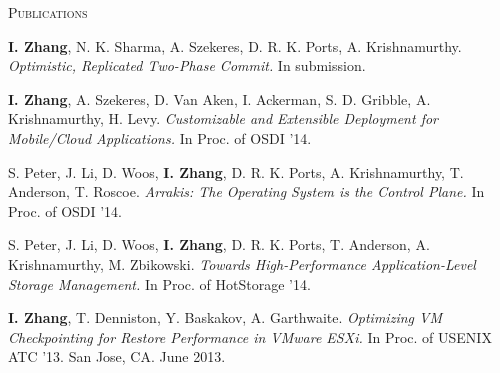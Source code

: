 \documentclass[10pt,times]{report}
\newlength{\sectiongap}
\newlength{\entrygap}
\newlength{\sectioncolwidth}
\newlength{\colgap}
\newlength{\stuffwidth}
\def\ifEqString#1#2{\def\testa{#1}\def\testb{#2}%
  \ifx\testa\testb}
\newenvironment{rtable}{
  \begin{minipage}{\textwidth}
  }{
  \end{minipage}
}
\newenvironment{rentry}[3][xxx]{
  \begin{minipage}[t]{\hsize}
    \textbf{#2}\ifEqString{#1}{xxx}\relax\else, \textit{#1}\fi
    \hspace{\stretch{1}} #3 \\
  }{
    \removelastskip
  \end{minipage}
  \\[\entrygap]  %
}
\newenvironment{rsection}[1]{
  \begin{minipage}[t]{\sectioncolwidth}
    \textsc{#1}
  \end{minipage}
  \hspace{\colgap}
  \begin{minipage}[t]{\stuffwidth}
  }{
    \removelastskip
  \end{minipage}
  \\[\sectiongap]
}
\begin{document}
\begin{rtable}
\vspace{1.0em}
 \begin{rsection}{Publications}
   \textbf{I. Zhang}, N. K. Sharma, A. Szekeres, D. R. K. Ports,
   A. Krishnamurthy. \textit{Optimistic, Replicated Two-Phase Commit.}
   In submission.\\\vspace{-0.5em}

   \textbf{I. Zhang}, A. Szekeres, D. Van Aken, I. Ackerman, S. D. Gribble,
   A. Krishnamurthy, H. Levy. \textit{Customizable and Extensible
     Deployment for Mobile/Cloud Applications.} In Proc. of OSDI '14.\\\vspace{-0.5em}

   S. Peter, J. Li, D. Woos, \textbf{I. Zhang}, D. R. K. Ports, A. Krishnamurthy,
   T. Anderson, T. Roscoe. \textit{Arrakis: The Operating System is
     the Control Plane.} In Proc. of OSDI '14.\\\vspace{-0.5em}

   S. Peter, J. Li, D. Woos, \textbf{I. Zhang}, D. R. K. Ports, T. Anderson,
   A. Krishnamurthy, M. Zbikowski. \textit{Towards High-Performance
     Application-Level Storage Management.} In Proc. of HotStorage
   '14. \\\vspace{-0.5em}

    \textbf{I. Zhang}, T. Denniston, Y. Baskakov, A. Garthwaite. \textit{Optimizing
      VM Checkpointing for Restore Performance in VMware ESXi.} In
    Proc. of USENIX ATC '13. San Jose, CA. June 2013.\\\vspace{-0.5em}


\end{rsection}
\end{rtable}
\end{document}
